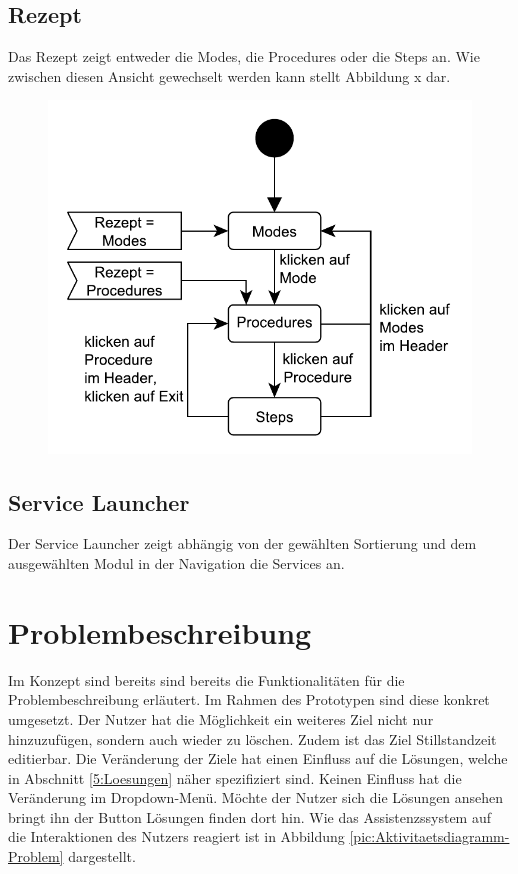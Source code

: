 \subsection{Rezept}
Das Rezept zeigt entweder die Modes, die Procedures oder die Steps an. Wie zwischen diesen Ansicht gewechselt werden kann stellt Abbildung x dar.
\begin{figure}[htbp]
\centering
\includegraphics[scale=0.6]{DA_files/Bilder/Prototyp/Zustandsdiagramm-Rezept.pdf}
\label{pic:Zustandsdiagramm-Rezept}
\end{figure}

\subsection{Service Launcher}
Der Service Launcher zeigt abhängig von der gewählten Sortierung und dem ausgewählten Modul in der Navigation die Services an.

\section{Problembeschreibung}
Im Konzept sind bereits sind bereits die Funktionalitäten für die Problembeschreibung erläutert. Im Rahmen des Prototypen sind diese konkret umgesetzt. Der Nutzer hat die Möglichkeit ein weiteres Ziel nicht nur hinzuzufügen, sondern auch wieder zu löschen. Zudem ist das Ziel Stillstandzeit editierbar. Die Veränderung der Ziele hat einen Einfluss auf die Lösungen, welche in Abschnitt \ref{5:Loesungen} näher spezifiziert sind. Keinen Einfluss hat die Veränderung im Dropdown-Menü. Möchte der Nutzer sich die Lösungen ansehen bringt ihn der Button Lösungen finden dort hin. Wie das Assistenzssystem auf die Interaktionen des Nutzers reagiert ist in Abbildung \ref{pic:Aktivitaetsdiagramm-Problem} dargestellt.

